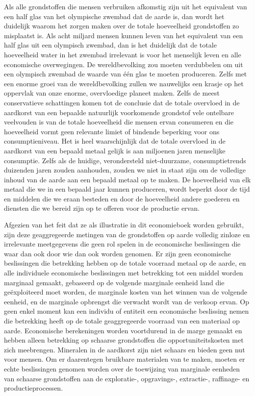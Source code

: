 \documentclass[
  a5paper,
  smalldemyvopaper,11pt,twoside,onecolumn,openright,extrafontsizes,
hidelinks]{memoir}
\begin{document}
Als alle grondstoffen die mensen verbruiken afkomstig zijn uit het
equivalent van een half glas van het olympische zwembad dat de aarde is,
dan wordt het duidelijk waarom het zorgen maken over de totale
hoeveelheid grondstoffen zo misplaatst is. Als acht miljard mensen
kunnen leven van het equivalent van een half glas uit een olympisch
zwembad, dan is het duidelijk dat de totale hoeveelheid water in het
zwembad irrelevant is voor het menselijk leven en alle economische
overwegingen. De wereldbevolking zou moeten verdubbelen om uit een
olympisch zwembad de waarde van één glas te moeten produceren. Zelfs met
een enorme groei van de wereldbevolking zullen we nauwelijks een krasje
op het oppervlak van onze enorme, overvloedige planeet maken. Zelfs de
meest conservatieve schattingen komen tot de conclusie dat de totale
overvloed in de aardkorst van een bepaalde natuurlijk voorkomende
grondstof vele ontelbare veelvouden is van de totale hoeveelheid die
mensen ervan consumeren en die hoeveelheid vormt geen relevante limiet
of bindende beperking voor ons consumptieniveau. Het is heel
waarschijnlijk dat de totale overvloed in de aardkorst van een bepaald
metaal gelijk is aan miljoenen jaren menselijke consumptie. Zelfs als de
huidige, verondersteld niet-duurzame, consumptietrends duizenden jaren
zouden aanhouden, zouden we niet in staat zijn om de volledige inhoud
van de aarde aan een bepaald metaal op te maken. De hoeveelheid van elk
metaal die we in een bepaald jaar kunnen produceren, wordt beperkt door
de tijd en middelen die we eraan besteden en door de hoeveelheid andere
goederen en diensten die we bereid zijn op te offeren voor de productie
ervan.

Afgezien van het feit dat ze als illustratie in dit economieboek worden
gebruikt, zijn deze geaggregeerde metingen van de grondstoffen op aarde
volledig zinloze en irrelevante meetgegevens die geen rol spelen in de
economische beslissingen die waar dan ook door wie dan ook worden
genomen. Er zijn geen economische beslissingen die betrekking hebben op
de totale voorraad metaal op de aarde, en alle individuele economische
beslissingen met betrekking tot een middel worden marginaal gemaakt,
gebaseerd op de volgende marginale eenheid land die geëxploiteerd moet
worden, de marginale kosten van het winnen van de volgende eenheid, en
de marginale opbrengst die verwacht wordt van de verkoop ervan. Op geen
enkel moment kan een individu of entiteit een economische beslissing
nemen die betrekking heeft op de totale geaggregeerde voorraad van een
materiaal op aarde. Economische berekeningen worden voortdurend in de
marge gemaakt en hebben alleen betrekking op schaarse grondstoffen die
opportuniteitskosten met zich meebrengen. Mineralen in de aardkorst zijn
niet schaars en bieden geen nut voor mensen. Om er daarentegen bruikbare
materialen van te maken, moeten er echte beslissingen genomen worden
over de toewijzing van marginale eenheden van schaarse grondstoffen aan
de exploratie-, opgravings-, extractie-, raffinage- en
productieprocessen.
\end{document}
